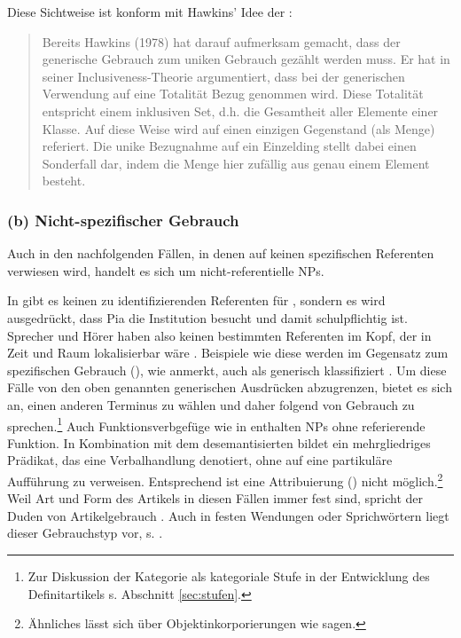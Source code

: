 Diese Sichtweise ist konform mit Hawkins' Idee der :  \blockcquote[43]{Studler2011}{Bereits Hawkins (1978) hat darauf aufmerksam gemacht, dass der generische Gebrauch zum uniken Gebrauch gezählt werden muss. Er hat in seiner Inclusiveness-Theorie argumentiert, dass bei der generischen Verwendung auf eine Totalität Bezug genommen wird. Diese Totalität entspricht einem inklusiven Set, d.h. die Gesamtheit
aller Elemente einer Klasse. Auf diese Weise wird auf einen einzigen Gegenstand (als
Menge) referiert. Die unike Bezugnahme auf ein Einzelding stellt dabei einen Sonderfall
dar, indem die Menge hier zufällig aus genau einem Element besteht.} 


\subsubsection{(b) Nicht-spezifischer Gebrauch}\label{nicht-spez}

Auch in den nachfolgenden Fällen, in denen  auf keinen spezifischen Referenten verwiesen wird, handelt es sich um nicht-referentielle NPs. 

\begin{exe}
	\ex \label{ex:nonref}   
	\begin{xlist}
		\ex \label{ex:schule-pia}  
		\ex \label{ex:fvg} 
		\end{xlist}
\end{exe}
\noindent 
In  gibt es keinen zu identifizierenden Referenten für , sondern es wird ausgedrückt, dass Pia die Institution  besucht und damit schulpflichtig ist. Sprecher und Hörer haben also keinen bestimmten Referenten im Kopf, der in Zeit und Raum lokalisierbar wäre \parencite[40]{Bisle-Muller1991}. Beispiele wie diese werden im Gegensatz zum spezifischen Gebrauch (), wie \textcite[245]{Studler2011} anmerkt, auch als generisch klassifiziert \parencite[ähnlich][90]{Szczepaniak2011a}. Um diese Fälle von den oben genannten generischen Ausdrücken abzugrenzen, bietet es sich an, einen anderen Terminus zu wählen und daher \textcite[54]{Bisle-Muller1991} folgend von  Gebrauch zu sprechen.\footnote{Zur Diskussion der Kategorie  als kategoriale Stufe in der Entwicklung des Definitartikels s. Abschnitt \ref{sec:stufen}.} Auch Funktionsverbgefüge wie in  enthalten NPs ohne referierende Funktion. In Kombination mit dem desemantisierten  bildet  ein mehrgliedriges Prädikat, das eine Verbalhandlung denotiert, ohne auf eine partikuläre Aufführung zu verweisen. Entsprechend ist eine Attribuierung () nicht möglich.\footnote{Ähnliches lässt sich über Objektinkorporierungen wie  sagen.} Weil Art und Form des Artikels in diesen Fällen immer fest sind, spricht der Duden von  Artikelgebrauch \parencite[297f.]{Duden2009}. Auch in festen Wendungen oder Sprichwörtern liegt dieser Gebrauchstyp vor, s.   \parencite[298]{Duden2009}.  

